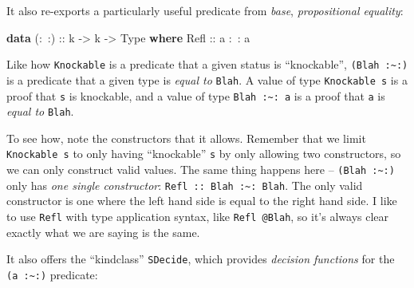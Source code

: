 \documentclass[]{article}
\newenvironment{Shaded}{}{}
\newcommand{\DataTypeTok}[1]{\textcolor[rgb]{0.56,0.13,0.00}{#1}}
\newcommand{\FunctionTok}[1]{\textcolor[rgb]{0.02,0.16,0.49}{#1}}
\newcommand{\KeywordTok}[1]{\textcolor[rgb]{0.00,0.44,0.13}{\textbf{#1}}}
\newcommand{\NormalTok}[1]{#1}
\newcommand{\OtherTok}[1]{\textcolor[rgb]{0.00,0.44,0.13}{#1}}
\begin{document}
It also re-exports a particularly useful predicate from \emph{base},
\emph{propositional equality}:

\begin{Shaded}
\begin{Highlighting}[]
\KeywordTok{data}\OtherTok{ (:~:) ::}\NormalTok{ k }\OtherTok{->}\NormalTok{ k }\OtherTok{->} \DataTypeTok{Type} \KeywordTok{where}
    \DataTypeTok{Refl}\OtherTok{ ::}\NormalTok{ a }\FunctionTok{:~:}\NormalTok{ a}
\end{Highlighting}
\end{Shaded}

Like how \texttt{Knockable} is a predicate that a given status is ``knockable'',
\texttt{(\textquotesingle{}Blah\ :\textasciitilde{}:)} is a predicate that a
given type is \emph{equal to} \texttt{\textquotesingle{}Blah}. A value of type
\texttt{Knockable\ s} is a proof that \texttt{s} is knockable, and a value of
type \texttt{\textquotesingle{}Blah\ :\textasciitilde{}:\ a} is a proof that
\texttt{a} is \emph{equal to} \texttt{\textquotesingle{}Blah}.

To see how, note the constructors that it allows. Remember that we limit
\texttt{Knockable\ s} to only having ``knockable'' \texttt{s} by only allowing
two constructors, so we can only construct valid values. The same thing happens
here -- \texttt{(\textquotesingle{}Blah\ :\textasciitilde{}:)} only has
\emph{one single constructor}:
\texttt{Refl\ ::\ \textquotesingle{}Blah\ :\textasciitilde{}:\ \textquotesingle{}Blah}.
The only valid constructor is one where the left hand side is equal to the right
hand side. I like to use \texttt{Refl} with type application syntax, like
\texttt{Refl\ @\textquotesingle{}Blah}, so it's always clear exactly what we are
saying is the same.

It also offers the ``kindclass'' \texttt{SDecide}, which provides \emph{decision
functions} for the \texttt{(a\ :\textasciitilde{}:)} predicate:

\begin{Shaded}
\end{Shaded}
\end{document}

